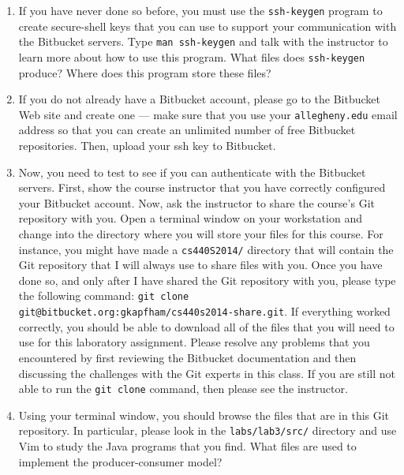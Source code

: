 \begin{enumerate}
	
  \item If you have never done so before, you must use the {\tt ssh-keygen} program to create secure-shell keys that you
    can use to support your communication with the Bitbucket servers.  Type {\tt man ssh-keygen} and talk with the
    instructor to learn more about how to use this program.  What files does {\tt ssh-keygen} produce?  Where
    does this program store these files?

  \item If you do not already have a Bitbucket account, please go to the Bitbucket Web site and create one --- 
    make sure that you use your {\tt allegheny.edu} email address so that you can create an unlimited number of free
    Bitbucket repositories. Then, upload your ssh key to Bitbucket.

  \item Now, you need to test to see if you can authenticate with the Bitbucket servers.  First, show the course instructor that
    you have correctly configured your Bitbucket account.  Now, ask the instructor to share the course's Git repository with you.
    Open a terminal window on your workstation and change into the directory where you will store your files for this course.  For
    instance, you might have made a {\tt cs440S2014/} directory that will contain the Git repository that I will always use to
    share files with you.  Once you have done so, and only after I have shared the Git repository with you, please type the
    following command: {\tt git clone git@bitbucket.org:gkapfham/cs440s2014-share.git}.  If everything worked correctly, you
    should be able to download all of the files that you will need to use for this laboratory assignment. Please resolve any
    problems that you encountered by first reviewing the Bitbucket documentation and then discussing the challenges with the Git
    experts in this class. If you are still not able to run the {\tt git clone} command, then please see the instructor.

  \item Using your terminal window, you should browse the files that are in this Git repository.  In particular, please look in
    the {\tt labs/lab3/src/} directory and use Vim to study the Java programs that you find. What files are used to implement the
    producer-consumer model?

\end{enumerate}

